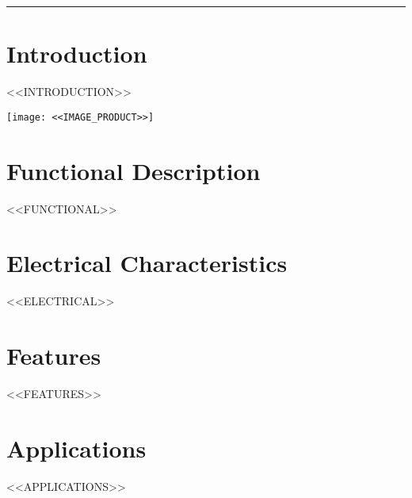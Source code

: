 \documentclass[10pt]{article}
\title{}
\author{}
\date{}
\begin{document}
\noindent
{}
\vspace{1em}
\hrule
\vspace{1.5em}

\section*{Introduction}
\vspace{0.5em}
\noindent
\begin{minipage}[t]{0.62\textwidth}
\setlength{\parskip}{0.75em}
\justifying
<<INTRODUCTION>>
\end{minipage}
\hfill
\begin{minipage}[t]{0.35\textwidth}
\centering
\vspace{-0.5em}
\texttt{[image: <<IMAGE\_PRODUCT>>]}
\end{minipage}

\vspace{1.0em}
\FloatBarrier %



\section*{Functional Description}
<<FUNCTIONAL>>

\section*{Electrical Characteristics}
<<ELECTRICAL>>

\section*{Features}
<<FEATURES>>



\section*{Applications}
<<APPLICATIONS>>
\end{document}
